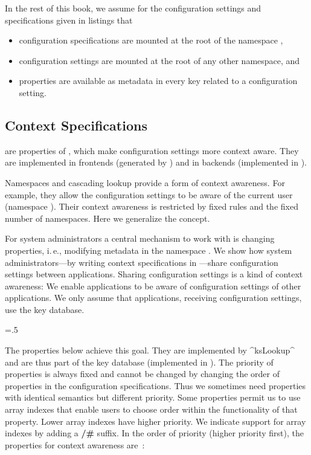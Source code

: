 In the rest of this book, we assume for the configuration settings and specifications given in listings that
\begin{itemize}
\item configuration specifications are mounted at the root of the namespace ,
\item configuration settings are mounted at the root of any other namespace, and
\item properties are available as metadata in every key related to a configuration setting.
\end{itemize}





\subsection{Context Specifications}
\label{sec:context-specification}

 are properties of , which make configuration settings more context aware.
They are implemented in frontends (generated by ) and in backends (implemented in ).

Namespaces and cascading lookup provide a form of context awareness.
For example, they allow the configuration settings to be aware of the current user (namespace ).
Their context awareness is restricted by fixed rules and the fixed number of namespaces.
Here we generalize the concept.

For system administrators a central mechanism to work with \elektra{} is changing properties, i.\,e., modifying metadata in the namespace .
We show how system administrators---by writing context specifications in ---share configuration settings between applications.
Sharing configuration settings is a kind of context awareness:
We enable applications to be aware of configuration settings of other applications.
We only assume that applications, receiving configuration settings, use the key database.%
{\textwidth \emergencystretch=.5\textwidth \par}

The properties below achieve this goal.
They are implemented by ^ksLookup^ and are thus part of the key database (implemented in ).
The priority of prop\-erties is always fixed and cannot be changed by changing the order of properties in the configuration specifications.
Thus we sometimes need properties with identical semantics but different priority.
Some properties permit us to use array indexes that enable users to choose order within the functionality of that property.
Lower array indexes have higher priority.
We indicate support for array indexes by adding a \textbf{/\#} suffix.
In the order of priority (higher priority first), the properties for context awareness are~\cite{raab2015kps}:

